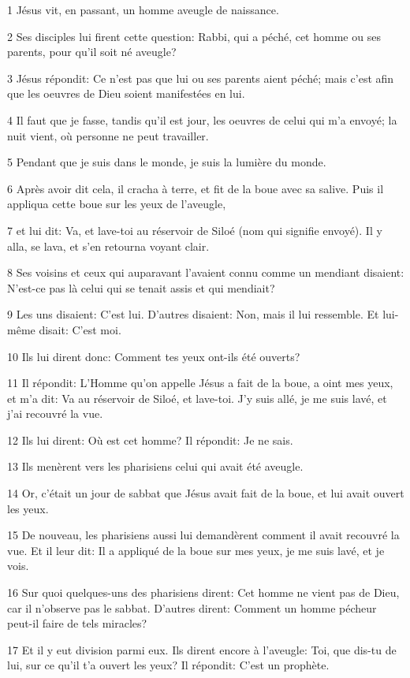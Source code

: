 \par 1 Jésus vit, en passant, un homme aveugle de naissance.
\par 2 Ses disciples lui firent cette question: Rabbi, qui a péché, cet homme ou ses parents, pour qu'il soit né aveugle?
\par 3 Jésus répondit: Ce n'est pas que lui ou ses parents aient péché; mais c'est afin que les oeuvres de Dieu soient manifestées en lui.
\par 4 Il faut que je fasse, tandis qu'il est jour, les oeuvres de celui qui m'a envoyé; la nuit vient, où personne ne peut travailler.
\par 5 Pendant que je suis dans le monde, je suis la lumière du monde.
\par 6 Après avoir dit cela, il cracha à terre, et fit de la boue avec sa salive. Puis il appliqua cette boue sur les yeux de l'aveugle,
\par 7 et lui dit: Va, et lave-toi au réservoir de Siloé (nom qui signifie envoyé). Il y alla, se lava, et s'en retourna voyant clair.
\par 8 Ses voisins et ceux qui auparavant l'avaient connu comme un mendiant disaient: N'est-ce pas là celui qui se tenait assis et qui mendiait?
\par 9 Les uns disaient: C'est lui. D'autres disaient: Non, mais il lui ressemble. Et lui-même disait: C'est moi.
\par 10 Ils lui dirent donc: Comment tes yeux ont-ils été ouverts?
\par 11 Il répondit: L'Homme qu'on appelle Jésus a fait de la boue, a oint mes yeux, et m'a dit: Va au réservoir de Siloé, et lave-toi. J'y suis allé, je me suis lavé, et j'ai recouvré la vue.
\par 12 Ils lui dirent: Où est cet homme? Il répondit: Je ne sais.
\par 13 Ils menèrent vers les pharisiens celui qui avait été aveugle.
\par 14 Or, c'était un jour de sabbat que Jésus avait fait de la boue, et lui avait ouvert les yeux.
\par 15 De nouveau, les pharisiens aussi lui demandèrent comment il avait recouvré la vue. Et il leur dit: Il a appliqué de la boue sur mes yeux, je me suis lavé, et je vois.
\par 16 Sur quoi quelques-uns des pharisiens dirent: Cet homme ne vient pas de Dieu, car il n'observe pas le sabbat. D'autres dirent: Comment un homme pécheur peut-il faire de tels miracles?
\par 17 Et il y eut division parmi eux. Ils dirent encore à l'aveugle: Toi, que dis-tu de lui, sur ce qu'il t'a ouvert les yeux? Il répondit: C'est un prophète.
